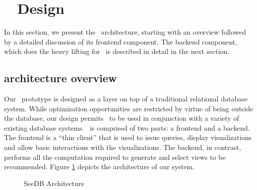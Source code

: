 

\section{{\large \SeeDB\ } Design}
\label{sec:system_architecture}

In this section, we present the \SeeDB\ architecture, starting with an
overview followed by a detailed discussion of its frontend component.
The backend component, which does the heavy lifting for \SeeDB\ is described
in detail in the next section.

\subsection{{\large \SeeDB} architecture overview}
\label{subsec:overview}

Our \SeeDB\ prototype is designed as a layer on top of a traditional
relational database system.
While optimization opportunities are restricted by virtue of being outside the
database, our design permits \SeeDB\ to be used in conjunction with a variety of
existing database systems. 
\SeeDB\ is comprised of two parts: a frontend and a backend. 
The frontend is a ``thin client'' that
is used to issue queries, display visualizations  and allow basic interactions
with the visualizations. 
The backend, in contrast, performs all the computation required to generate and select views
to be recommended. Figure \ref{fig:sys-arch}
depicts the architecture of our system.

\begin{figure}[htb]
\vspace{-10pt}
\centerline{
\hbox{}}
\caption{SeeDB Architecture}
\label{fig:sys-arch}
\vspace{-12pt}
\end{figure} 


